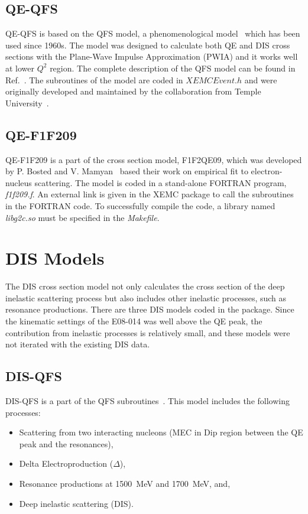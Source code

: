  \subsection{QE-QFS}
  QE-QFS is based on the QFS model, a phenomenological model~\cite{qfs_org,qfs_note} which has been used since 1960s. The model was designed to calculate both QE and DIS cross sections with the Plane-Wave Impulse Approximation (PWIA) and it works well at lower $Q^{2}$ region. The complete description of the QFS model can be found in Ref.~\cite{qfs_org,qfs_org2}. The subroutines of the model are coded in $XEMCEvent.h$ and were originally developed and maintained by the collaboration from Temple University~\cite{karl_thesis, hyao_thesis,whita}. 
   
 \subsection{QE-F1F209}
 QE-F1F209 is a part of the cross section model, F1F2QE09, which was developed by P. Bosted and V. Mamyan~\cite{Bosted:2012qc} based their work on empirical fit to electron-nucleus scattering. The model is coded in a stand-alone FORTRAN program, \emph{f1f209.f}. An external link is given in the XEMC package to call the subroutines in the FORTRAN code. To successfully compile the code, a library named \emph{libg2c.so} must be specified in the \emph{Makefile}.
 
\section{DIS Models}
 The DIS cross section model not only calculates the cross section of the deep inelastic scattering process but also includes other inelastic processes, such as resonance productions. There are three DIS models coded in the package. Since the kinematic settings of the E08-014 was well above the QE peak, the contribution from inelastic processes is relatively small, and these models were not iterated with the existing DIS data. 
 
\subsection{DIS-QFS}
 DIS-QFS is a part of the QFS subroutines~\cite{hyao_thesis}.  This model includes the following processes:
 \begin{itemize}
  \item Scattering from two interacting nucleons (MEC in Dip region between the QE peak and the resonances),
  \item Delta Electroproduction ($\Delta$),
  \item Resonance productions at 1500~MeV and 1700~MeV, and,
  \item Deep inelastic scattering (DIS).
 \end{itemize}
  
